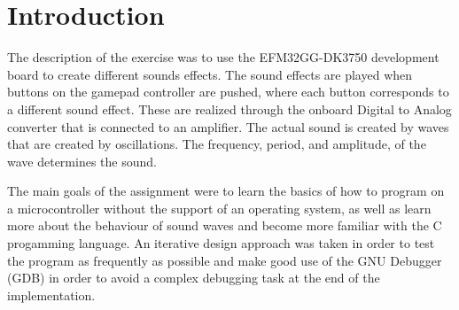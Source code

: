 \section{Introduction}
The description of the exercise was to use the EFM32GG-DK3750 development board to create different sounds effects. The sound effects are played when buttons on the gamepad controller are pushed, where each button corresponds to a different sound effect. These are realized through the onboard Digital to Analog converter that is connected to an amplifier. The actual sound is created by waves that are created by oscillations. The frequency, period, and amplitude, of the wave determines the sound. 

The main goals of the assignment were to learn the basics of how to program on a microcontroller without the support of an operating system, as well as learn more about the behaviour of sound waves and become more familiar with the C progamming language. An iterative design approach was taken in order to test the program as frequently as possible and make good use of the GNU Debugger (GDB) in order to avoid a complex debugging task at the end of the implementation.






    

